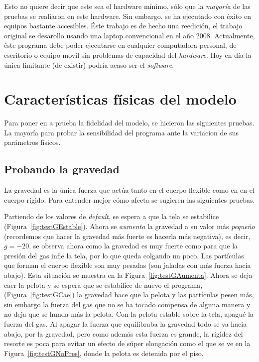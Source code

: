 Esto no quiere decir que este sea el hardware mínimo, sólo que la \emph{mayoría} de las pruebas se realiaron en este hardware.
Sin embargo, se ha ejecutado con éxito en equipos bastante accesibles. 
Éste trabajo es de hecho una reedición, el trabajo original se desarollo usando una laptop convencional en el año 2008.
Actualmente, éste programa debe poder ejecutarse en cualquier computadora personal, de escritorio o equipo movil sin problemas de capacidad del \emph{\textenglish{hardware}}.
Hoy en día la única limitante (de existir) podría acaso ser el \emph{\textenglish{software}}.

\section{Características físicas del modelo}
Para poner en a prueba la fidelidad del modelo, se hicieron las siguientes pruebas.
La mayoría para probar la sensibilidad del programa ante la variacion de sus parámetros físicos.

\subsection{Probando la gravedad}
La gravedad es la única fuerza que actúa tanto en el cuerpo flexible como en en el cuerpo rígido. Para entender mejor cómo afecta se sugieren las siguientes pruebas.

Partiendo de los valores de \emph{\foreignlanguage{english}{default}}, se espera a que la tela se estabilice (Figura~\ref{fig:testGEstable}).
Ahora se \emph{aumenta} la gravedad a su valor más \emph{pequeño} (recordemos que hacer la gravedad más fuerte es hacerla más negativa), es decir, $g=-20$, se observa ahora como la gravedad es muy fuerte como para que la presión del gas infle la tela, por lo que queda colgando un poco.
Las partículas que forman el cuerpo flexible son muy pesadas (son jaladas con más fuerza hacia abajo).
Esta situación se muestra en la Figura~\ref{fig:testGAumenta}. 
Ahora se deja caer la pelota y se espera que se estabilice de nuevo el programa, (Figura~\ref{fig:testGCae}) la gravedad hace que la pelota y las partículas pesen más, sin embargo la fuerza del gas que no se ha tocado compensa de alguna manera y no deja que se hunda más la pelota.
Con la pelota estable sobre la tela, apagué la fuerza del gas.
Al apagar la fuerza que equilibraba la gravedad todo se va hacia abajo, por la gravedad, pero como además esta fuerza es grande, la rigidez del resorte es poca para evitar un efecto de súper elongación como el que se ve en la Figura~\ref{fig:testGNoPres}, donde la pelota es detenida por el piso.


